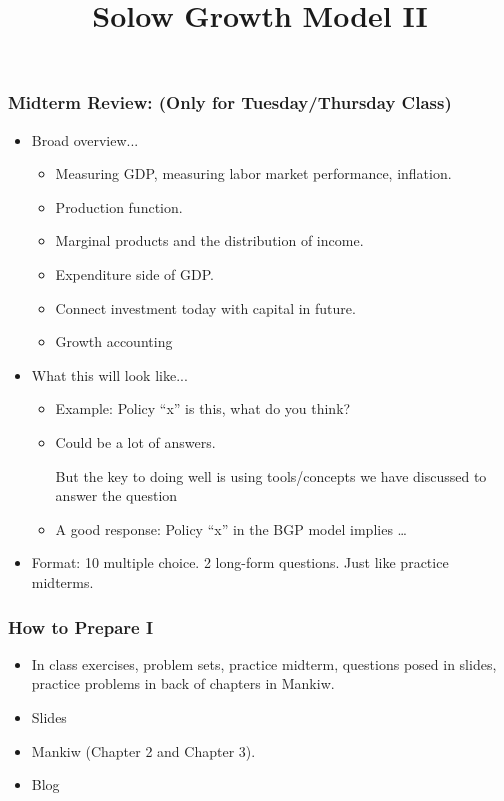 \documentclass[9pt]{beamer}
\title[NYU Stern] %
{\huge Solow Growth Model II}
\author[Michael Waugh] %
{\bf{\Large}}%
\date[] %
\begin{document}



\begin{frame}[t]
\frametitle{Midterm Review: (Only for Tuesday/Thursday Class)}
\begin{itemize}
\item Broad overview...
\begin{itemize}
\medskip
\item Measuring GDP, measuring labor market performance, inflation.
\medskip
\item Production function.
\medskip
\item Marginal products and the distribution of income.
\medskip
\item Expenditure side of GDP.
\medskip
\item Connect investment today with capital in future. 
\medskip
\item Growth accounting
\end{itemize}
\bigskip
\item What this will look like...
\begin{itemize}
\medskip
\item Example: Policy ``x'' is this, what do you think?
\medskip
\item Could be a lot of answers. \begin{alertenv}{But the key to doing well is using tools/concepts we have discussed to answer the question}\end{alertenv}
\medskip
\item A good response: Policy ``x'' in the BGP model implies \ldots
\end{itemize}
\medskip
\item Format: 10 multiple choice. 2 long-form questions. Just like practice midterms.
\end{itemize}
\bigskip
\end{frame}



\begin{frame}[t]
\frametitle{How to Prepare I}
\begin{itemize}
\item In class exercises, problem sets, practice midterm, questions posed in slides, practice problems in back of chapters in Mankiw.
\medskip
\item Slides
\medskip
\item Mankiw (Chapter 2 and Chapter 3).
\medskip
\item Blog
\end{itemize}
\end{frame}
\end{document}
